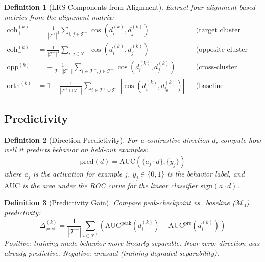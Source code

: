 \documentclass[11pt]{article}
\newtheorem{definition}{Definition}[section]
\begin{document}
\begin{definition}[LRS Components from Alignment]
Extract four alignment-based metrics from the alignment matrix:
\begin{align}
\text{coh}^{(k)}_+ &= \frac{1}{|\mathcal{T}^+|^2} \sum_{i,j \in \mathcal{T}^+} \cos(d^{(k)}_i, d^{(k)}_j) & &\text{(target cluster coherence)} \\[0.5em]
\text{coh}^{(k)}_- &= \frac{1}{|\mathcal{T}^-|^2} \sum_{i,j \in \mathcal{T}^-} \cos(d^{(k)}_i, d^{(k)}_j) & &\text{(opposite cluster coherence)} \\[0.5em]
\text{opp}^{(k)} &= -\frac{1}{|\mathcal{T}^+||\mathcal{T}^-|} \sum_{i \in \mathcal{T}^+, j \in \mathcal{T}^-} \cos(d^{(k)}_i, d^{(k)}_j) & &\text{(cross-cluster opposition)} \\[0.5em]
\text{orth}^{(k)} &= 1 - \frac{1}{|\mathcal{T}^+ \cup \mathcal{T}^-|} \sum_{i \in \mathcal{T}^+ \cup \mathcal{T}^-} \left|\cos(d^{(k)}_i, d^{(k)}_{t_0})\right| & &\text{(baseline orthogonality)}
\end{align}
\end{definition}

\subsection{Predictivity}

\begin{definition}[Direction Predictivity]
For a contrastive direction $d$, compute how well it predicts behavior on held-out examples:
\begin{equation}
\text{pred}(d) = \text{AUC}(\{a_j \cdot d\}, \{y_j\})
\end{equation}
where $a_j$ is the activation for example $j$, $y_j \in \{0, 1\}$ is the behavior label, and $\text{AUC}$ is the area under the ROC curve for the linear classifier $\text{sign}(a \cdot d)$.
\end{definition}

\begin{definition}[Predictivity Gain]
Compare peak-checkpoint vs.\ baseline ($\mathcal{M}_0$) predictivity:
\begin{equation}
\Delta_{\text{pred}}^{(k)} = \frac{1}{|\mathcal{T}^+|} \sum_{i \in \mathcal{T}^+} \left(\text{AUC}^{\text{peak}}(d^{(k)}_i) - \text{AUC}^{\text{pre}}(d^{(k)}_i)\right)
\end{equation}
Positive: training made behavior more linearly separable. Near-zero: direction was already predictive. Negative: unusual (training degraded separability).
\end{definition}
\end{document}
